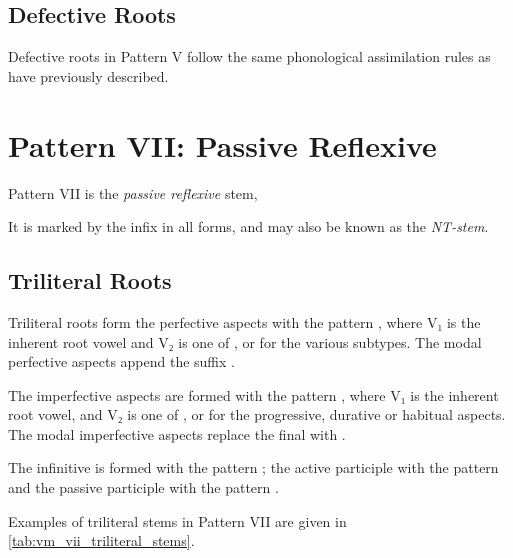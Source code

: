 \documentclass[grammar]{subfiles}
\begin{document}
\subsection{Defective Roots}
\label{ssec:vm_vi_defective_roots}

Defective roots in Pattern V follow the same phonological assimilation rules
as have previously described. 


\clearpage
\section{Pattern VII: Passive Reflexive}
\label{sec:vm_pattern_vii}

Pattern VII is the \emph{passive reflexive} stem, 
%

It is marked by the infix  in all forms, and may also be known as the \emph{NT-stem}.


\subsection{Triliteral Roots}
\label{ssec:vm_vii_triliteral_roots}

Triliteral roots form the perfective aspects with the pattern
, where V₁ is the inherent root vowel and V₂ is one of
,  or  for the various subtypes.  The modal perfective
aspects append the suffix .

The imperfective aspects are formed with the pattern ,
where V₁ is the inherent root vowel, and V₂ is one of ,  or
 for the progressive, durative or habitual aspects.  The modal
imperfective aspects replace the final  with .

The infinitive is formed with the pattern ; the active participle
with the pattern  and the passive participle with the pattern
. 

Examples of triliteral stems in Pattern VII are given in \cref{tab:vm_vii_triliteral_stems}. 
\end{document}
